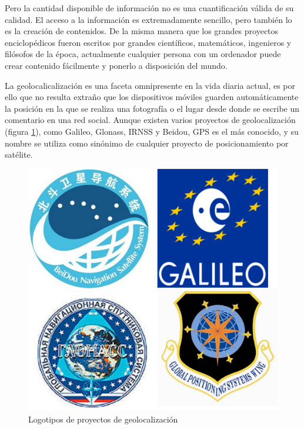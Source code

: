 Pero la cantidad disponible de información no es una cuantificación válida de su calidad. El acceso a la información es extremadamente sencillo, pero también lo es la creación de contenidos. De la misma manera que los grandes proyectos enciclopédicos fueron escritos por grandes científicos, matemáticos, ingenieros y filósofos de la época, actualmente cualquier persona con un ordenador puede crear contenido fácilmente y ponerlo a disposición del mundo.


La geolocalicalización es una faceta omnipresente en la vida diaria actual, es por ello que no resulta extraño que los dispositivos móviles guarden automáticamente la posición en la que se realiza una fotografía o el lugar desde donde se escribe un comentario en una red social. Aunque existen varios proyectos de geolocalización (figura \ref{Logos_satelites}), como Galileo, Glonass, IRNSS y Beidou, GPS es el más conocido, y su nombre se utiliza como sinónimo de cualquier proyecto de posicionamiento por satélite.

\begin{figure}[hbtp]
\centering
\includegraphics[scale=0.75, fbox={\fboxrule} 4mm]{images/introduccion/Sistemas_posicionamiento_satelites.jpg}
\caption{Logotipos de proyectos de geolocalización}
\label{Logos_satelites}
\end{figure}


